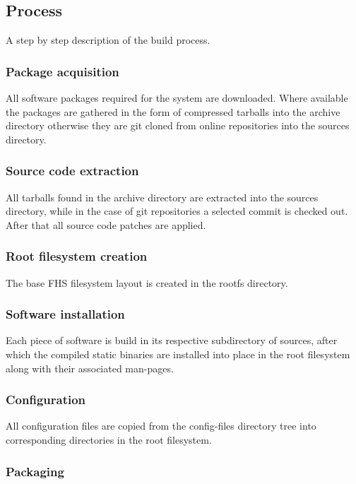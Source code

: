 \subsection{Process}

A step by step description of the build process.

\subsubsection{Package acquisition}

All software packages required for the system are downloaded. Where available the packages are gathered in the form of compressed tarballs into the archive directory otherwise they are git cloned from online repositories into the sources directory.

\subsubsection{Source code extraction}

All tarballs found in the archive directory are extracted into the sources directory, while in the case of git repositories a selected commit is checked out. After that all source code patches are applied.

\subsubsection{Root filesystem creation}

The base FHS filesystem layout is created in the rootfs directory.

\subsubsection{Software installation}

Each piece of software is build in its respective subdirectory of sources, after which the compiled static binaries are installed into place in the root filesystem along with their associated man-pages.

\subsubsection{Configuration}

All configuration files are copied from the config-files directory tree into corresponding directories in the root filesystem.

\subsubsection{Packaging}

